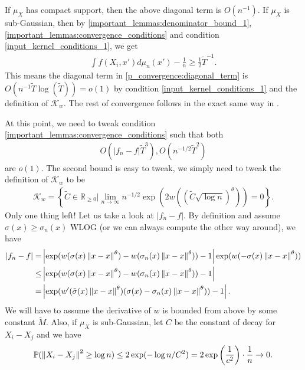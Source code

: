 \documentclass[10pt]{article}
\begin{document}
If $\mu_X$ has compact support, then the above diagonal term is $O(n^{-1})$. If $\mu_X$ is sub-Gaussian, then by \eqref{important_lemmas:denominator_bound_1}, \eqref{important_lemmas:convergence_conditions} and condition \ref{input_kernel_conditions_1}, we get
\begin{align}
  \int f(X_i,x')d\mu_n(x')-\frac{1}{n} \geq \frac{1}{2} \tilde{T}^{-1}.
\end{align}
This means the diagonal term in \eqref{p_convergence:diagonal_term} is $O(n^{-1}\tilde{T}\log(\tilde{T})) = o(1)$ by condition \ref{input_kernel_conditions_1} and the definition of $\mathcal{K}_w$. The rest of convergence follows in the exact same way in \cite{auffinger-tsne}.

At this point, we need to tweak condition
\ref{important_lemmas:convergence_conditions} such that both
\begin{align}
  O(|f_n-f|\tilde{T}^3), O(n^{-1/2}\tilde{T}^2)
\end{align}
are $o(1)$. The second bound is easy to tweak, we simply need to tweak the definition of $\mathcal{K}_w$ to be
\begin{align} \label{important_lemmas:convergence_conditions_temp}
  \mathcal{K}_w = \left\{\tilde{C} \in \mathbb{R}_{\geq 0} \bigg\rvert \lim_{n \to \infty} n^{-1/2} \exp \left(2 w\left(\left(\tilde{C} \sqrt{\log n} \right)^{\theta} \right) \right) = 0 \right\}.
\end{align}
Only one thing left! Let us take a look at $|f_n-f|$. By definition and assume $\sigma(x) \geq \sigma_n(x)$ WLOG (or we can always compute the other way around), we have
\begin{align} \label{f_convergence:difference}
  |f_n-f| = & \left|\exp(w(\sigma(x)\left\lVert x-x\right\rVert^{\theta})-w(\sigma_n(x)\left\lVert x-x\right\rVert^{\theta}))-1\right|\exp(w(-\sigma(x)\left\lVert x-x\right\rVert^{\theta})) \nonumber \\
  \leq      & \left|\exp(w(\sigma(x)\left\lVert x-x\right\rVert^{\theta})-w(\sigma_n(x)\left\lVert x-x\right\rVert^{\theta}))-1\right| \nonumber                                       \\
  =         & \left|\exp(w'(\tilde{\sigma}(x)\left\lVert x-x\right\rVert^{\theta})(\sigma(x)-\sigma_n(x)\left\lVert x-x\right\rVert^{\theta}))-1\right|.
\end{align}
We will have to assume the derivative of $w$ is bounded from above by some constant $\tilde{M}$. Also, if $\mu_X$ is sub-Gaussian, let $C$ be the constant of decay for $X_i-X_j$ and we have
\begin{align} \label{distance_esti}
  \mathbb{P}(\left\lVert X_i-X_j\right\rVert^2 \geq \log n) \leq 2 \exp(-\log n /C^2) = 2 \exp\left(\frac{1}{c^2}\right) \cdot \frac{1}{n} \to 0.
\end{align}
\end{document}
